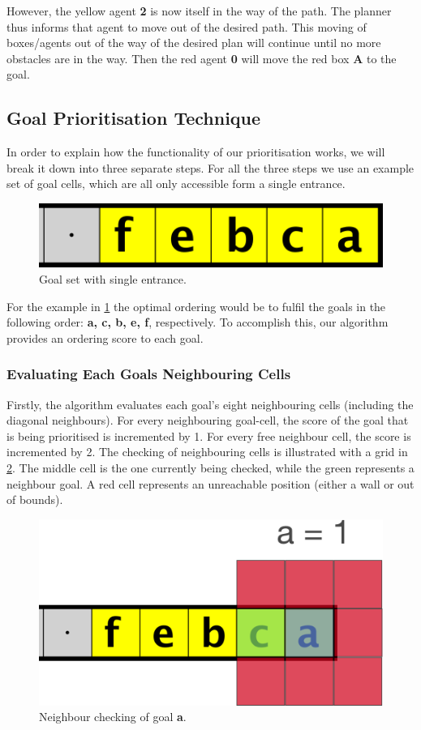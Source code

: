 However, the yellow agent \textbf{2} is now itself in the way of the path.
The planner thus informs that agent to move out of the desired path.
This moving of boxes/agents out of the way of the desired plan will continue until no more obstacles are in the way.
Then the red agent \textbf{0} will move the red box \textbf{A} to the goal.

\subsection{Goal Prioritisation Technique}
\label{methods:goal_ordering}

In order to explain how the functionality of our prioritisation works, we will break it down into three separate steps. For all the three steps we use an example set of goal cells, which are all only accessible form a single entrance. 

\begin{figure}[h!]
  \centering
  \includegraphics[width=.5\columnwidth]{graphics/ie_level.png}
  \caption{\label{fig:sample}Goal set with single entrance.}
\end{figure}

For the example in \cref{fig:sample} the optimal ordering would be to fulfil the goals in the following order: \textbf{a, c, b, e, f}, respectively.
To accomplish this, our algorithm provides an ordering score to each goal. 

\subsubsection{Evaluating Each Goals Neighbouring Cells}

Firstly, the algorithm evaluates each goal's eight neighbouring cells (including the diagonal neighbours). 
For every neighbouring goal-cell, the score of the goal that is being prioritised is incremented by 1.
For every free neighbour cell, the score is incremented by 2. 
The checking of neighbouring cells is illustrated with a grid in \cref{fig:grid1}. 
The middle cell is the one currently being checked, while the green represents a neighbour goal. 
A red cell represents an unreachable position (either a wall or out of bounds).

\begin{figure}[ht!]
  \centering
  \includegraphics[width=.5\columnwidth]{graphics/goal_pri_1.png}
  \caption{\label{fig:grid1}Neighbour checking of goal \textbf{a}.}
\end{figure}

